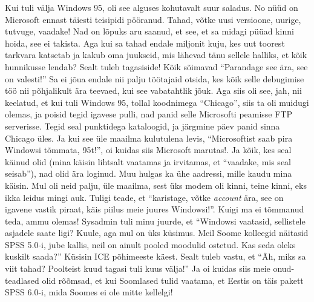 Kui tuli välja Windows 95, oli see alguses kohutavalt suur saladus. No nüüd on Microsoft ennast täiesti teisipidi pööranud. Tahad, võtke uusi versioone, uurige, tutvuge, vaadake! Nad on lõpuks aru saanud, et see, et sa midagi püüad kinni hoida, see ei takista. Aga kui sa tahad endale miljonit kuju, kes uut toorest tarkvara katsetab ja kakub oma juukseid, mis lähevad tänu sellele halliks, et kõik hunnikusse lendab? Sealt tuleb tagasiside! Kõik sõimavad \enquote{Parandage see ära, see on valesti!} Sa ei jõua endale nii palju töötajaid otsida, kes  kõik selle debugimise töö nii põhjalikult ära teevaed, kui see vabatahtlik jõuk. Aga siis oli see, jah, nii keelatud, et kui tuli Windows 95, tollal koodnimega \enquote{Chicago}, siis ta oli muidugi olemas, ja poisid tegid igavese pulli, nad panid selle Microsofti peamisse FTP serverisse. Tegid seal punktidega kataloogid, ja järgmine päev panid sinna Chicago üles. Ja kui see üle  maailma kulutulena levis, \enquote{Microsoftist saab pira Windowsi tõmmata, 95t!}, oi kuidas siis Microsoft marutas!. Ja kõik, kes seal käinud olid (mina käisin lihtsalt vaatamas ja irvitamas,  et \enquote{vaadake, mis seal seisab}), nad olid ära loginud. Muu hulgas ka ühe  aadressi, mille kaudu mina käisin. Mul oli neid palju, üle maailma, sest üks modem oli kinni, teine kinni, eks ikka leidus mingi auk. Tuligi teade, et \enquote{karistage, võtke \emph{account} ära, see on igavene vastik piraat, käis piilus meie juures Windowsi!}. Kuigi ma ei tõmmanud teda, ammu olemas! Sysadmin tuli minu juurde, et \enquote{Windowsi vaatasid, sellistele asjadele saate ligi? Kuule, aga mul on üks küsimus. Meil Soome kolleegid näitasid SPSS  5.0-i, jube kallis, neil on ainult pooled moodulid ostetud. Kas seda oleks kuskilt saada?} Küsisin ICE põhimeeste käest. Sealt tuleb vastu, et \enquote{Äh, miks sa viit tahad? Poolteist kuud tagasi tuli kuus välja!} Ja oi kuidas siis meie onud-teadlased olid rõõmsad, et kui Soomlased tulid vaatama, et Eestis on täis pakett SPSS 6.0-i, mida Soomes ei ole mitte kellelgi! 

